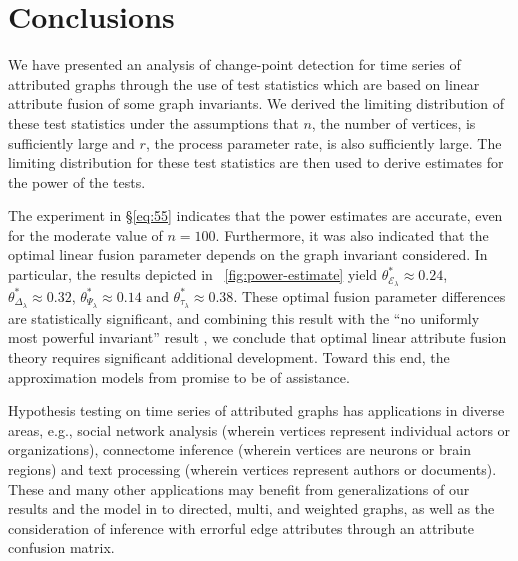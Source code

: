 \documentclass[10pt,journal,compsoc]{IEEEtran}
\theoremstyle{definition}
\begin{document}
\section{Conclusions}
We have presented an analysis of change-point detection for time
series of attributed graphs through the use of test statistics which
are based on linear attribute fusion of some graph invariants. 
We derived the limiting distribution of these test statistics under
the assumptions that $n$, the number of vertices, is sufficiently
large and $r$, the process parameter rate, is also sufficiently
large. The limiting distribution for these test statistics are then
used to derive estimates for the power of the tests. 

The experiment in \S \ref{eq:55} indicates that the power estimates are accurate, even
for the moderate value of $n = 100$. Furthermore, it was also
indicated that the optimal linear fusion parameter depends on the
graph invariant considered. In particular, the results depicted in
\figurename~\ref{fig:power-estimate} yield
  $\theta^{*}_{\mathcal{E}_{\lambda}} \approx 0.24$,
  $\theta^{*}_{\Delta_{\lambda}} \approx 0.32$,
  $\theta^{*}_{\Psi_{\lambda}} \approx 0.14$ and
  $\theta^{*}_{\tau_{\lambda}} \approx 0.38$. These optimal fusion
  parameter differences are statistically significant, and combining
  this result with the ``no uniformly most powerful invariant'' result
  \cite{pao11:_statis_infer_random_graph}, we conclude that optimal
  linear attribute fusion theory requires significant additional
  development. Toward this end, the approximation models from
  \cite{lee11} promise to
  be of assistance.

  Hypothesis testing on time series of attributed graphs has
  applications in diverse areas, e.g., social network analysis
  (wherein vertices represent individual actors or organizations), connectome
  inference (wherein vertices are neurons or brain regions) and text
  processing (wherein vertices represent authors or documents). These
  and many other applications may benefit from generalizations of our
  results and the
  model in \cite{lee11} to
  directed, multi, and weighted graphs, as well as the consideration
  of inference with errorful edge attributes through an attribute
  confusion matrix.
  \appendices
\end{document}
